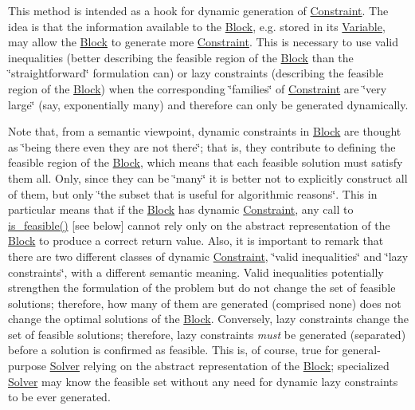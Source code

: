 This method is intended as a hook for dynamic generation of \mbox{\hyperlink{class_s_m_spp__di__unipi__it_1_1_constraint}{Constraint}}. The idea is that the information available to the \mbox{\hyperlink{class_s_m_spp__di__unipi__it_1_1_block}{Block}}, e.\+g. stored in its \mbox{\hyperlink{class_s_m_spp__di__unipi__it_1_1_variable}{Variable}}, may allow the \mbox{\hyperlink{class_s_m_spp__di__unipi__it_1_1_block}{Block}} to generate more \mbox{\hyperlink{class_s_m_spp__di__unipi__it_1_1_constraint}{Constraint}}. This is necessary to use valid inequalities (better describing the feasible region of the \mbox{\hyperlink{class_s_m_spp__di__unipi__it_1_1_block}{Block}} than the \char`\"{}straightforward\char`\"{} formulation can) or lazy constraints (describing the feasible region of the \mbox{\hyperlink{class_s_m_spp__di__unipi__it_1_1_block}{Block}}) when the corresponding \char`\"{}families\char`\"{} of \mbox{\hyperlink{class_s_m_spp__di__unipi__it_1_1_constraint}{Constraint}} are \char`\"{}very large\char`\"{} (say, exponentially many) and therefore can only be generated dynamically.

Note that, from a semantic viewpoint, dynamic constraints in \mbox{\hyperlink{class_s_m_spp__di__unipi__it_1_1_block}{Block}} are thought as \char`\"{}being there even they are not there\char`\"{}; that is, they contribute to defining the feasible region of the \mbox{\hyperlink{class_s_m_spp__di__unipi__it_1_1_block}{Block}}, which means that each feasible solution must satisfy them all. Only, since they can be \char`\"{}many\char`\"{} it is better not to explicitly construct all of them, but only \char`\"{}the
subset that is useful for algorithmic reasons\char`\"{}. This in particular means that if the \mbox{\hyperlink{class_s_m_spp__di__unipi__it_1_1_block}{Block}} has dynamic \mbox{\hyperlink{class_s_m_spp__di__unipi__it_1_1_constraint}{Constraint}}, any call to \mbox{\hyperlink{class_s_m_spp__di__unipi__it_1_1_block_a4204ffb542117f4ea97eeceeda4da079}{is\+\_\+feasible()}} \mbox{[}see below\mbox{]} cannot rely only on the abstract representation of the \mbox{\hyperlink{class_s_m_spp__di__unipi__it_1_1_block}{Block}} to produce a correct return value. Also, it is important to remark that there are two different classes of dynamic \mbox{\hyperlink{class_s_m_spp__di__unipi__it_1_1_constraint}{Constraint}}, \char`\"{}valid
inequalities\char`\"{} and \char`\"{}lazy constraints\char`\"{}, with a different semantic meaning. Valid inequalities potentially strengthen the formulation of the problem but do not change the set of feasible solutions; therefore, how many of them are generated (comprised none) does not change the optimal solutions of the \mbox{\hyperlink{class_s_m_spp__di__unipi__it_1_1_block}{Block}}. Conversely, lazy constraints change the set of feasible solutions; therefore, lazy constraints {\itshape must} be generated (separated) before a solution is confirmed as feasible. This is, of course, true for general-\/purpose \mbox{\hyperlink{class_s_m_spp__di__unipi__it_1_1_solver}{Solver}} relying on the abstract representation of the \mbox{\hyperlink{class_s_m_spp__di__unipi__it_1_1_block}{Block}}; specialized \mbox{\hyperlink{class_s_m_spp__di__unipi__it_1_1_solver}{Solver}} may know the feasible set without any need for dynamic lazy constraints to be ever generated.

